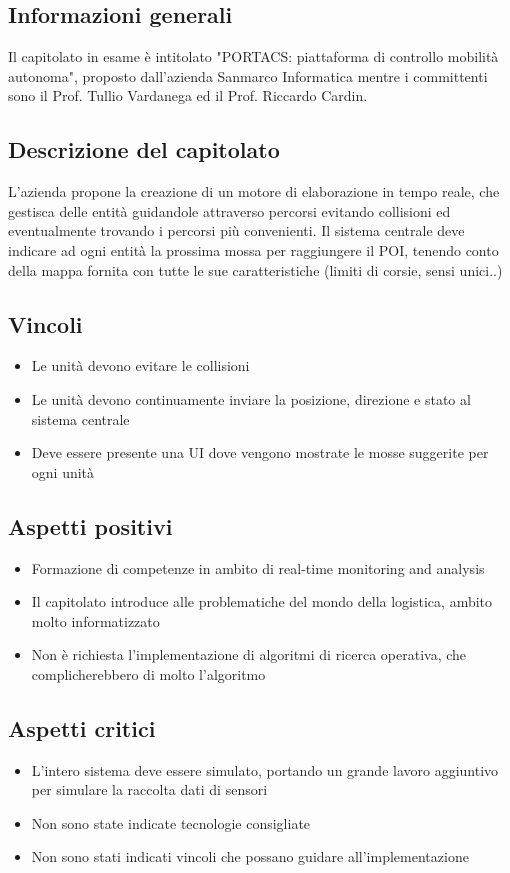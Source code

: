 \subsection{Informazioni generali}
Il capitolato in esame è intitolato "PORTACS: piattaforma di controllo mobilità autonoma", proposto dall'azienda Sanmarco Informatica mentre i committenti sono il Prof. Tullio Vardanega ed il Prof. Riccardo Cardin.
\subsection{Descrizione del capitolato}
L'azienda propone la creazione di un motore di elaborazione in tempo reale, che gestisca delle entità guidandole attraverso percorsi evitando collisioni ed eventualmente trovando i percorsi più convenienti.
Il sistema centrale deve indicare ad ogni entità la prossima mossa per raggiungere il POI, tenendo conto della mappa fornita con tutte le sue caratteristiche (limiti di corsie, sensi unici..)
\subsection{Vincoli}
\begin{itemize}
    \item Le unità devono evitare le collisioni
    \item Le unità devono continuamente inviare la posizione, direzione e stato al sistema centrale
    \item Deve essere presente una UI dove vengono mostrate le mosse suggerite per ogni unità
\end{itemize}
\subsection{Aspetti positivi}
\begin{itemize}
    \item Formazione di competenze in ambito di real-time monitoring and analysis
    \item Il capitolato introduce alle problematiche del mondo della logistica, ambito molto informatizzato
    \item Non è richiesta l'implementazione di algoritmi di ricerca operativa, che complicherebbero di molto l'algoritmo
\end{itemize}
\subsection{Aspetti critici}
\begin{itemize}
    \item L'intero sistema deve essere simulato, portando un grande lavoro aggiuntivo per simulare la raccolta dati di sensori
    \item Non sono state indicate tecnologie consigliate
    \item Non sono stati indicati vincoli che possano guidare all'implementazione
\end{itemize}
